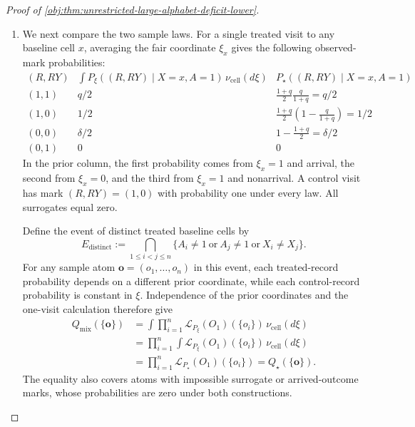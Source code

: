 \begin{proof}[Proof of \cref{obj:thm:unrestricted-large-alphabet-deficit-lower}]
\begin{enumerate}
Under \(P_\star\), an action in \(E_{\mathrm{test}}^c\) satisfies
\[
w-\tau(P_\star)
>
\left(\frac12-\frac{h_{\mathrm{sep}}}{2}\right)
-\left(\frac12-h_{\mathrm{sep}}\right)
=\frac{h_{\mathrm{sep}}}{2}.
\]
In particular, its squared loss is at least \(h_{\mathrm{sep}}^2/16\), so
\[
\frac{h_{\mathrm{sep}}^2}{16}
(Q_\star\ltimes\mathsf T)(E_{\mathrm{test}}^c)
\le\mathcal R_\star(\mathsf T).
\]

\item We next compare the two sample laws. For a single treated visit to any baseline cell \(x\), averaging the fair coordinate \(\xi_x\) gives the following observed-mark probabilities:
\[
\begin{array}{c|c|c}
(R,RY)
&
\displaystyle\int P_\xi((R,RY)\mid X=x,A=1)\,
\nu_{\mathrm{cell}}(d\xi)
&
P_\star((R,RY)\mid X=x,A=1)
\\ \hline
(1,1)&q/2&
\displaystyle\frac{1+q}{2}\frac q{1+q}=q/2
\\
(1,0)&1/2&
\displaystyle\frac{1+q}{2}\left(1-\frac q{1+q}\right)=1/2
\\
(0,0)&\delta/2&
\displaystyle1-\frac{1+q}{2}=\delta/2
\\
(0,1)&0&0
\end{array}
\]
In the prior column, the first probability comes from \(\xi_x=1\) and arrival, the second from \(\xi_x=0\), and the third from \(\xi_x=1\) and nonarrival. A control visit has mark \((R,RY)=(1,0)\) with probability one under every law. All surrogates equal zero.

Define the event of distinct treated baseline cells by
\[
E_{\mathrm{distinct}}
:=
\bigcap_{1\le i<j\le n}
\{A_i\ne1\ \text{or}\ A_j\ne1\ \text{or}\ X_i\ne X_j\}.
\]
For any sample atom \(\mathbf o=(o_1,\ldots,o_n)\) in this event, each treated-record probability depends on a different prior coordinate, while each control-record probability is constant in \(\xi\). Independence of the prior coordinates and the one-visit calculation therefore give
\[
\begin{aligned}
Q_{\mathrm{mix}}(\{\mathbf o\})
&=
\int
\prod_{i=1}^n
\mathcal L_{P_\xi}(O_1)(\{o_i\})\,
\nu_{\mathrm{cell}}(d\xi)
\\
&=
\prod_{i=1}^n
\int
\mathcal L_{P_\xi}(O_1)(\{o_i\})\,
\nu_{\mathrm{cell}}(d\xi)
\\
&=
\prod_{i=1}^n
\mathcal L_{P_\star}(O_1)(\{o_i\})
=
Q_\star(\{\mathbf o\}).
\end{aligned}
\]
The equality also covers atoms with impossible surrogate or arrived-outcome marks, whose probabilities are zero under both constructions. %


\end{enumerate}
\end{proof}
